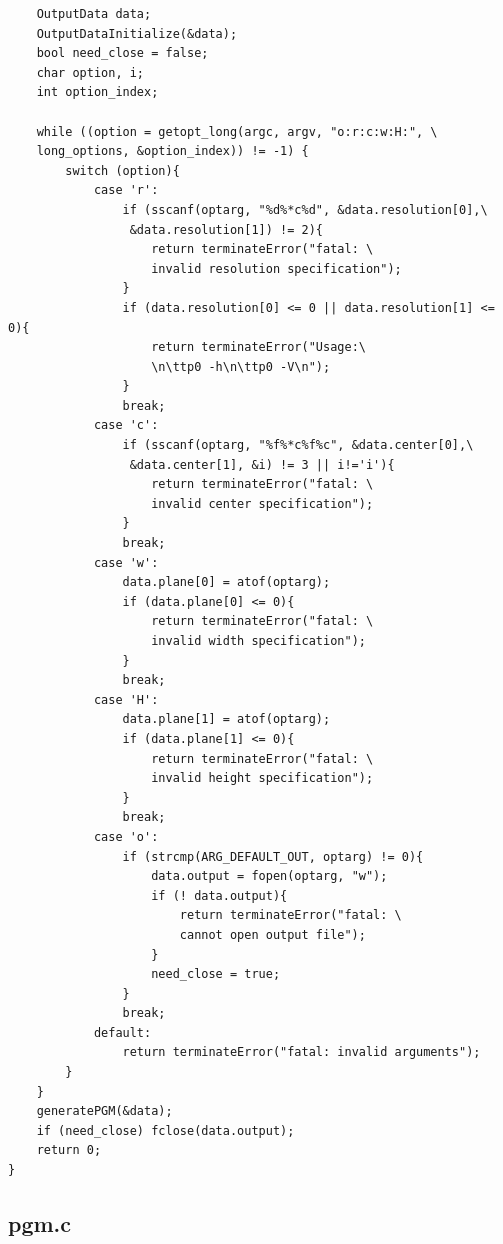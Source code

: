 \documentclass[a4paper,10pt]{article}
\begin{document}
\begin{verbatim}
    OutputData data;
    OutputDataInitialize(&data);
    bool need_close = false;
    char option, i;
    int option_index;

    while ((option = getopt_long(argc, argv, "o:r:c:w:H:", \
    long_options, &option_index)) != -1) {
        switch (option){
            case 'r':
                if (sscanf(optarg, "%d%*c%d", &data.resolution[0],\
                 &data.resolution[1]) != 2){
                    return terminateError("fatal: \
                    invalid resolution specification");
                }
                if (data.resolution[0] <= 0 || data.resolution[1] <= 0){
                    return terminateError("Usage:\
                    \n\ttp0 -h\n\ttp0 -V\n");
                }
                break;
            case 'c':
                if (sscanf(optarg, "%f%*c%f%c", &data.center[0],\
                 &data.center[1], &i) != 3 || i!='i'){
                    return terminateError("fatal: \
                    invalid center specification");
                }
                break;
            case 'w':
                data.plane[0] = atof(optarg);
                if (data.plane[0] <= 0){
                    return terminateError("fatal: \
                    invalid width specification");
                }
                break;
            case 'H':
                data.plane[1] = atof(optarg);
                if (data.plane[1] <= 0){
                    return terminateError("fatal: \
                    invalid height specification");
                }
                break;
            case 'o':
                if (strcmp(ARG_DEFAULT_OUT, optarg) != 0){
                    data.output = fopen(optarg, "w");
                    if (! data.output){
                        return terminateError("fatal: \
                        cannot open output file");
                    }
                    need_close = true;
                }
                break;
            default:
                return terminateError("fatal: invalid arguments");
        }
    }
    generatePGM(&data);
    if (need_close) fclose(data.output);
    return 0;
}

\end{verbatim}
\pagebreak

\subsection{pgm.c}
\end{document}
